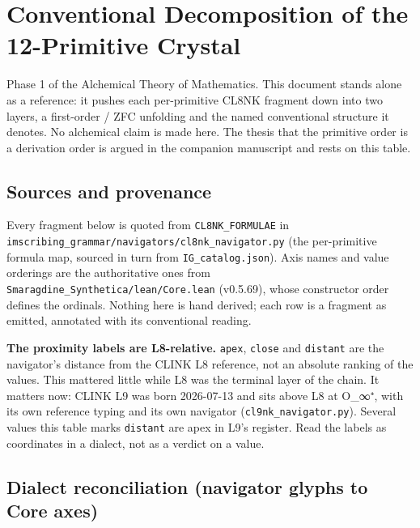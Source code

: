 \hypertarget{conventional-decomposition-of-the-12-primitive-crystal}{%
\section{Conventional Decomposition of the 12-Primitive
Crystal}\label{conventional-decomposition-of-the-12-primitive-crystal}}

Phase 1 of the Alchemical Theory of Mathematics. This document stands
alone as a reference: it pushes each per-primitive CL8NK fragment down
into two layers, a first-order / ZFC unfolding and the named
conventional structure it denotes. No alchemical claim is made here. The
thesis that the primitive order is a derivation order is argued in the
companion manuscript and rests on this table.

\hypertarget{sources-and-provenance}{%
\subsection{Sources and provenance}\label{sources-and-provenance}}

Every fragment below is quoted from \texttt{CL8NK\_FORMULAE} in
\texttt{imscribing\_grammar/navigators/cl8nk\_navigator.py} (the
per-primitive formula map, sourced in turn from
\texttt{IG\_catalog.json}). Axis names and value orderings are the
authoritative ones from \texttt{Smaragdine\_Synthetica/lean/Core.lean}
(v0.5.69), whose constructor order defines the ordinals. Nothing here is
hand derived; each row is a fragment as emitted, annotated with its
conventional reading.

\textbf{The proximity labels are L8-relative.} \texttt{apex},
\texttt{close} and \texttt{distant} are the navigator's distance from
the CLINK L8 reference, not an absolute ranking of the values. This
mattered little while L8 was the terminal layer of the chain. It matters
now: CLINK L9 was born 2026-07-13 and sits above L8 at O\_∞⁺, with its
own reference typing and its own navigator
(\texttt{cl9nk\_navigator.py}). Several values this table marks
\texttt{distant} are apex in L9's register. Read the labels as
coordinates in a dialect, not as a verdict on a value.

\hypertarget{dialect-reconciliation-navigator-glyphs-to-core-axes}{%
\subsection{Dialect reconciliation (navigator glyphs to Core
axes)}\label{dialect-reconciliation-navigator-glyphs-to-core-axes}}

